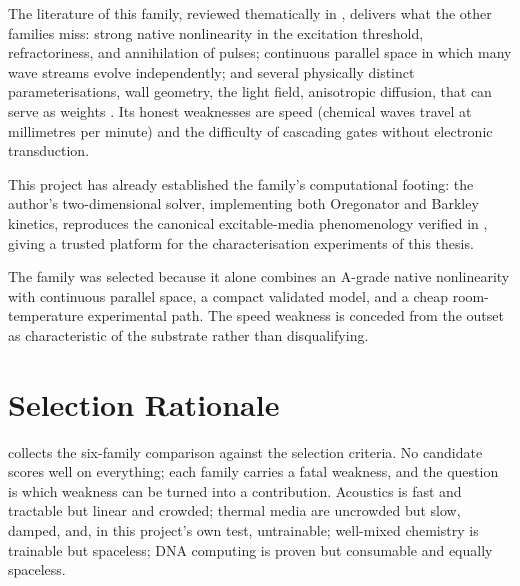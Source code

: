 The literature of this family, reviewed thematically in , delivers what the other families miss: strong native nonlinearity in the excitation threshold, refractoriness, and annihilation of pulses; continuous parallel space in which many wave streams evolve independently; and several physically distinct parameterisations, wall geometry, the light field, anisotropic diffusion, that can serve as weights \cite{toth1995logic, steinbock1996chemical, adamatzky2002xor, sakurai2002design}. Its honest weaknesses are speed (chemical waves travel at millimetres per minute) and the difficulty of cascading gates without electronic transduction.

This project has already established the family's computational footing: the author's two-dimensional solver, implementing both Oregonator and Barkley kinetics, reproduces the canonical excitable-media phenomenology verified in , giving a trusted platform for the characterisation experiments of this thesis.

The family was selected because it alone combines an A-grade native nonlinearity with continuous parallel space, a compact validated model, and a cheap room-temperature experimental path. The speed weakness is conceded from the outset as characteristic of the substrate rather than disqualifying.

\section{Selection Rationale}
\label{sec:lit_substrates}

 collects the six-family comparison against the selection criteria. No candidate scores well on everything; each family carries a fatal weakness, and the question is which weakness can be turned into a contribution. Acoustics is fast and tractable but linear and crowded; thermal media are uncrowded but slow, damped, and, in this project's own test, untrainable; well-mixed chemistry is trainable but spaceless; DNA computing is proven but consumable and equally spaceless.


